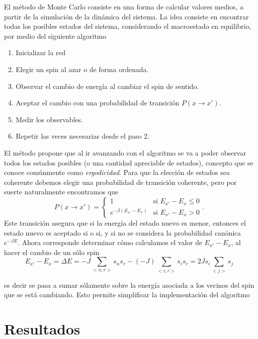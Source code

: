 \documentclass[12pt,a4paper]{article}
\begin{document}
El método de Monte Carlo consiste en una forma de calcular valores medios, a partir de la simulación de la dinámica del sistema. La idea consiste en encontrar todas los posibles estados del sistema, considerando el macroestado en equilibrio, por medio del siguiente algoritmo
\begin{enumerate}
\item Inicializar la red
\item Elegir un spin al azar o de forma ordenada.
\item Observar el cambio de energía al cambiar el spin de sentido.
\item Aceptar el cambio con una probabilidad de transición $P(x \to x')$.
\item Medir los observables.
\item Repetir las veces necesarias desde el paso 2.
\end{enumerate}
El método propone que al ir avanzando con el algoritmo se va a poder observar todos los estados posibles (o una cantidad apreciable de estados), concepto que se conoce comúnmente como \emph{ergodicidad}. Para que la elección de estados sea coherente debemos elegir una probabilidad de transición coherente, pero por suerte naturalmente encontramos que
\begin{equation}
  P(x \to x') = 
  \begin{cases}
    1 & \text{si } E_{x'} - E_x \leq 0 \\
    e^{-\beta (E_{x'} - E_x)} & \text{si } E_{x'} - E_x > 0
  \end{cases}.
\end{equation}
Este transición asegura que si la energía del estado nuevo es menor, entonces el estado nuevo es aceptado si o si, y si no se considera la probabilidad canónica $e^{-\beta E}$. Ahora corresponde determinar cómo calculamos el valor de $E_{x'} - E_{x}$, al hacer el cambio de un sólo spin
\begin{equation}
    E_{x'} - E_{x} = \Delta E = -J \sum_{<n,r>} s_n s_r - (-J) \sum_{<i,r>} s_i s_r =  2 J s_i \sum_{<j>} s_j 
\end{equation}

es decir se pasa a sumar sólamente sobre la energía asociada a los vecinos del spin que se está cambiando. Esto permite simplificar la implementación del algoritmo



\section{Resultados}
\end{document}
